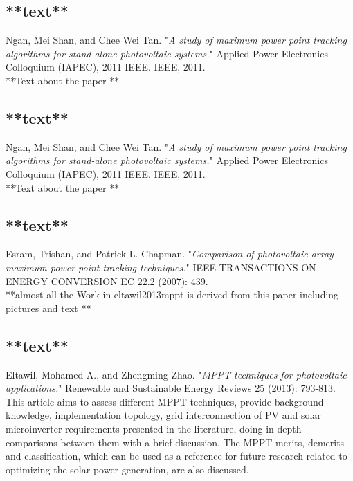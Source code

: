
\subsection{**text**\cite{ngan2011study}}

Ngan, Mei Shan, and Chee Wei Tan. "\textit{A study of maximum power point tracking algorithms for stand-alone photovoltaic systems.}" Applied Power Electronics Colloquium (IAPEC), 2011 IEEE. IEEE, 2011. \\

**Text about the paper **

\subsection{**text**\cite{ngan2011study}}

Ngan, Mei Shan, and Chee Wei Tan. "\textit{A study of maximum power point tracking algorithms for stand-alone photovoltaic systems.}" Applied Power Electronics Colloquium (IAPEC), 2011 IEEE. IEEE, 2011. \\

**Text about the paper **

\subsection{**text**\cite{esram2007comparison}}

Esram, Trishan, and Patrick L. Chapman. "\textit{Comparison of photovoltaic array maximum power point tracking techniques.}" IEEE TRANSACTIONS ON ENERGY CONVERSION EC 22.2 (2007): 439.\\

**almost all the Work in eltawil2013mppt is derived from this paper including pictures and text **



\subsection{**text**\cite{eltawil2013mppt}}

Eltawil, Mohamed A., and Zhengming Zhao. "\textit{MPPT techniques for photovoltaic applications.}" Renewable and Sustainable Energy Reviews 25 (2013): 793-813. \\

This article aims to assess different MPPT techniques, provide background knowledge, implementation topology, grid interconnection of PV and solar microinverter requirements presented in the literature, doing in depth comparisons between them with a brief discussion. The MPPT merits, demerits and classification, which can be used as a reference for future research related to optimizing the solar power generation, are also discussed.\\

